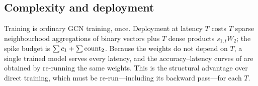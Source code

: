 \subsection{Complexity and deployment}
\label{sec:complexity}

Training is ordinary GCN training, once. Deployment at latency $T$ costs $T$ sparse neighbourhood
aggregations of binary vectors plus $T$ dense products $s_{1,t}W_{2}$; the spike budget is
$\sum c_{1} + \sum \mathrm{count}_{2}$. Because the weights do not depend on $T$, a single trained
model serves every latency, and the accuracy--latency curves of  are obtained by
re-running the same weights. This is the structural advantage over direct training, which must be
re-run---including its backward pass---for each $T$.

